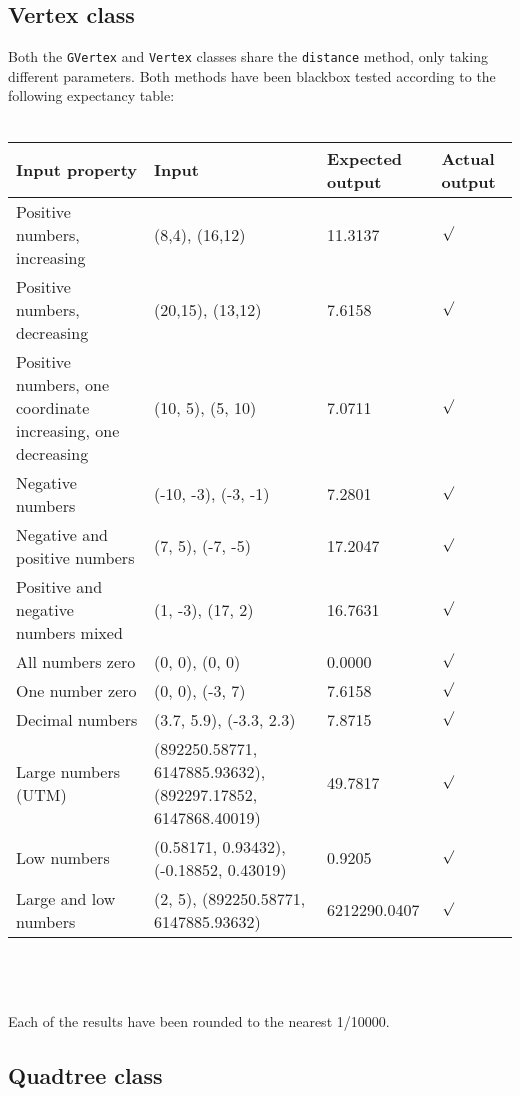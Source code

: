 \documentclass[a4paper,11pt]{article}
\begin{document}
\subsection{Vertex class}
\label{sec:Vertex class}
Both the \texttt{GVertex} and \texttt{Vertex} classes share the \texttt{distance} method, only taking different parameters. Both methods have been blackbox tested according to the following expectancy table: \\ \\
\begin{tabular}{ p{3.5cm} | p{4cm} | p{2.5cm} | p{1cm} }
	Input property & Input & Expected output & Actual output \\
	\hline
	Positive numbers, increasing & (8,4), (16,12) & 11.3137 & $\surd$ \\
	Positive numbers, decreasing & (20,15), (13,12) & 7.6158 & $\surd$ \\
	Positive numbers, one coordinate increasing, one decreasing & (10, 5), (5, 10) & 7.0711 & $\surd$ \\
	Negative numbers & (-10, -3), (-3, -1) & 7.2801 & $\surd$ \\
	Negative and positive numbers & (7, 5), (-7, -5) & 17.2047 & $\surd$ \\
	Positive and negative numbers mixed & (1, -3), (17, 2) & 16.7631 & $\surd$ \\
	All numbers zero & (0, 0), (0, 0) & 0.0000 & $\surd$ \\
	One number zero & (0, 0), (-3, 7) & 7.6158 & $\surd$ \\
	Decimal numbers & (3.7, 5.9), (-3.3, 2.3) & 7.8715 & $\surd$ \\
	Large numbers (UTM) & (892250.58771, 6147885.93632), (892297.17852, 6147868.40019) & 49.7817 & $\surd$ \\
	Low numbers & (0.58171, 0.93432), (-0.18852, 0.43019) & 0.9205 & $\surd$ \\
	Large and low numbers & (2, 5), (892250.58771, 6147885.93632) & 6212290.0407 & $\surd$
\end{tabular}
\\ \\ \\
Each of the results have been rounded to the nearest 1/10000.

\pagebreak
\subsection{Quadtree class}
\label{sec:Quadtree class}

\end{document}
